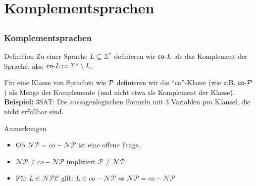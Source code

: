 

%
%

\section{Komplementsprachen}
\subsection{}

\begin{frame}
\frametitle{Komplementsprachen}
\begin{block}{Definition}
Zu einer Sprache $L \subseteq \Sigma^*$ definieren wir $\mathsf{co\text{-}} L$ als das Komplement der Sprache, also
$\mathsf{co\text{-}} L := \Sigma^*\setminus L$.
\end{block}
Für eine Klasse von Sprachen wie $\mathcal{P}$ definieren wir die "`co"'-Klasse (wie z.B. $\mathsf{co\text{-}}\mathcal{P}$) als Menge der Komplemente (und nicht etwa als Komplement der Klasse).\\[8pt]
\pause
\textbf{Beispiel:} \co 3SAT: Die aussagenlogischen Formeln mit 3 Variablen pro Klausel, die nicht erfüllbar sind.\\[8pt]

\begin{block}{Anmerkungen}
\begin{itemize}
\item Ob $\mathcal{NP} = co-\mathcal{NP}$ ist eine offene Frage.
\item $\mathcal{NP} \neq co-\mathcal{NP}$ impliziert $\mathcal{P} \neq \mathcal{NP}$ 
\item Für $L \in \mathcal{NPC}$ gilt: $L \in co-\mathcal{NP} \iff \mathcal{NP} =  co-\mathcal{NP}$
\end{itemize}
\end{block}
\end{frame}


